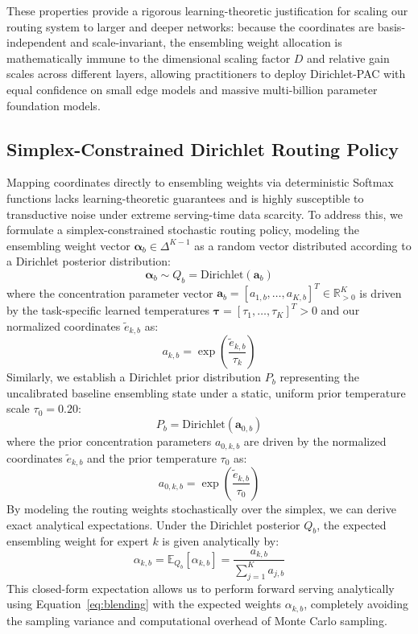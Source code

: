 These properties provide a rigorous learning-theoretic justification for scaling our routing system to larger and deeper networks: because the coordinates are basis-independent and scale-invariant, the ensembling weight allocation is mathematically immune to the dimensional scaling factor $D$ and relative gain scales across different layers, allowing practitioners to deploy Dirichlet-PAC with equal confidence on small edge models and massive multi-billion parameter foundation models.

\subsection{Simplex-Constrained Dirichlet Routing Policy}
Mapping coordinates directly to ensembling weights via deterministic Softmax functions lacks learning-theoretic guarantees and is highly susceptible to transductive noise under extreme serving-time data scarcity. To address this, we formulate a simplex-constrained stochastic routing policy, modeling the ensembling weight vector $\boldsymbol{\alpha}_b \in \Delta^{K-1}$ as a random vector distributed according to a Dirichlet posterior distribution:
\begin{equation}
  \boldsymbol{\alpha}_b \sim Q_b = \text{Dirichlet}(\mathbf{a}_b)
  \label{eq:posterior}
\end{equation}
where the concentration parameter vector $\mathbf{a}_b = [a_{1, b}, \dots, a_{K, b}]^T \in \mathbb{R}^K_{>0}$ is driven by the task-specific learned temperatures $\boldsymbol{\tau} = [\tau_1, \dots, \tau_K]^T > 0$ and our normalized coordinates $\tilde{e}_{k, b}$ as:
\begin{equation}
  a_{k, b} = \exp\left( \frac{\tilde{e}_{k, b}}{\tau_k} \right)
  \label{eq:concentration_post}
\end{equation}
Similarly, we establish a Dirichlet prior distribution $P_b$ representing the uncalibrated baseline ensembling state under a static, uniform prior temperature scale $\tau_0 = 0.20$:
\begin{equation}
  P_b = \text{Dirichlet}(\mathbf{a}_{0, b})
  \label{eq:prior}
\end{equation}
where the prior concentration parameters $a_{0, k, b}$ are driven by the normalized coordinates $\tilde{e}_{k, b}$ and the prior temperature $\tau_0$ as:
\begin{equation}
  a_{0, k, b} = \exp\left( \frac{\tilde{e}_{k, b}}{\tau_0} \right)
  \label{eq:concentration_prior}
\end{equation}
By modeling the routing weights stochastically over the simplex, we can derive exact analytical expectations. Under the Dirichlet posterior $Q_b$, the expected ensembling weight for expert $k$ is given analytically by:
\begin{equation}
  \alpha_{k, b} = \mathbb{E}_{Q_b}[\alpha_{k, b}] = \frac{a_{k, b}}{\sum_{j=1}^K a_{j, b}}
  \label{eq:expectation}
\end{equation}
This closed-form expectation allows us to perform forward serving analytically using Equation~\eqref{eq:blending} with the expected weights $\alpha_{k, b}$, completely avoiding the sampling variance and computational overhead of Monte Carlo sampling.

